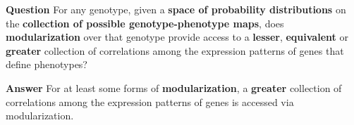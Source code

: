 \begin{frame}
\begin{block}{\textbf{Question}}
For any genotype, given a \textbf{space of probability distributions}
on the \textbf{collection of possible genotype-phenotype maps}, does \textbf{modularization} over that genotype provide access to a \textbf{lesser}, \textbf{equivalent} or \textbf{greater} collection of correlations among the expression patterns of genes that define phenotypes?
\end{block}
\begin{block}{\textbf{Answer}}
For at least some forms of \textbf{modularization}, a \textbf{greater} collection of correlations among the expression patterns of genes is accessed via modularization.
\end{block}
\end{frame}
